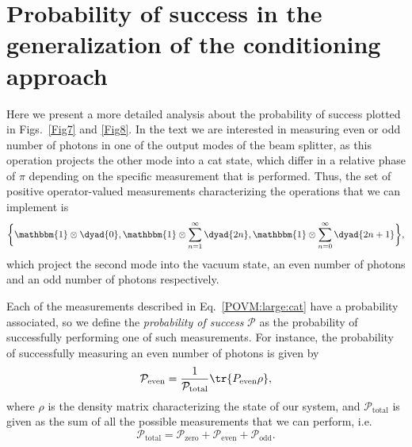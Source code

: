 \section{Probability of success in the generalization of the conditioning approach}\label{Appendix:A}
Here we present a more detailed analysis about the probability of success plotted in Figs.~\ref{Fig7} and \ref{Fig8}. In the text we are interested in measuring even or odd number of photons in one of the output modes of the beam splitter, as this operation projects the other mode into a cat state, which differ in a relative phase of $\pi$ depending on the specific measurement that is performed. Thus, the set of positive operator-valued measurements characterizing the operations that we can implement is
\begin{equation}\label{POVM:large:cat}
    \bigg\{ \mathbbm{1} \otimes \dyad{0},
        \mathbbm{1} \otimes \sum_{n=1}^{\infty} \dyad{2n},
        \mathbbm{1} \otimes \sum_{n=0}^{\infty} \dyad{2n+1}
    \bigg\},
\end{equation}
which project the second mode into the vacuum state, an even number of photons and an odd number of photons respectively.

Each of the measurements described in Eq.~\eqref{POVM:large:cat} have a probability associated, so we define the \emph{probability of success} $\mathcal{P}$ as the probability of successfully performing one of such measurements. For instance, the probability of successfully measuring an even number of photons is given by
\begin{equation}
    \mathcal{P}_\text{even}
        = \dfrac{1}{\mathcal{P}_\text{total}} \tr{P_\text{even}\rho},
\end{equation}
where $\rho$ is the density matrix characterizing the state of our system, and $\mathcal{P}_\text{total}$ is given as the sum of all the possible measurements that we can perform, i.e.
\begin{equation}
    \mathcal{P}_\text{total}
    = \mathcal{P}_\text{zero}
    + \mathcal{P}_\text{even}
    + \mathcal{P}_\text{odd}.
\end{equation}


